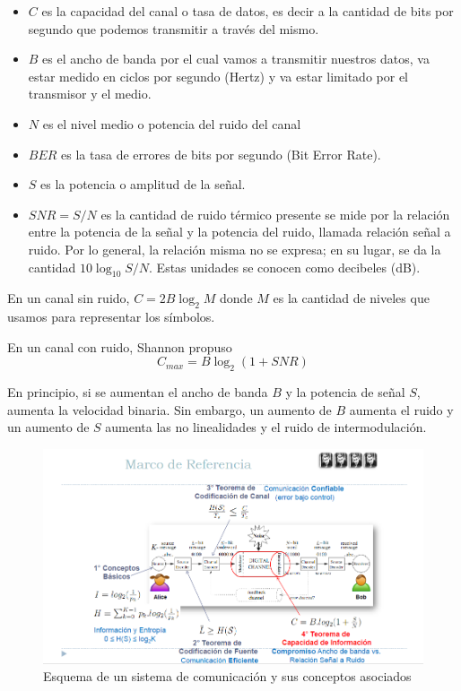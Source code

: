 \begin{itemize}
  \item \(C\) es la capacidad del canal o tasa de datos, es decir a la cantidad de bits por segundo que podemos transmitir a través del mismo.
  \item \(B\) es el ancho de banda por el cual vamos a transmitir nuestros datos, va estar medido en ciclos por segundo (Hertz) y va estar limitado por el transmisor y el medio.
  \item \(N\) es el nivel medio o potencia del ruido del canal
  \item \(BER\) es la tasa de errores de bits por segundo (Bit Error Rate).
  \item \(S\) es la potencia o amplitud de la señal.
  \item \(SNR = S / N\) es la cantidad de ruido térmico presente se mide por la relación entre la potencia de la señal y la potencia del ruido, llamada relación señal a ruido. Por lo general, la relación misma no se expresa; en su lugar, se da la cantidad \(10 \log_{10} S/N\).
  Estas unidades se conocen como decibeles (dB).
\end{itemize}

En un canal sin ruido, \(C = 2B\log_2 M\) donde \(M\) es la cantidad de niveles que usamos para representar los símbolos.

En un canal con ruido, Shannon propuso
\[C_{max} = B\log_2(1 + SNR)\]

En principio, si se aumentan el ancho de banda \(B\) y la potencia de señal \(S\), aumenta la velocidad binaria. Sin embargo, un aumento de \(B\) aumenta el ruido y un aumento de \(S\) aumenta las no linealidades y el ruido de intermodulación.

\begin{figure}[H]
	\centering
	\includegraphics[width=\textwidth
]{images/marco-referencia.png}
	\caption[Esquema de un sistema de comunicación y sus conceptos asociados]{Esquema de un sistema de comunicación y sus conceptos asociados}
	\label{fig:marco-referencai}
\end{figure}


